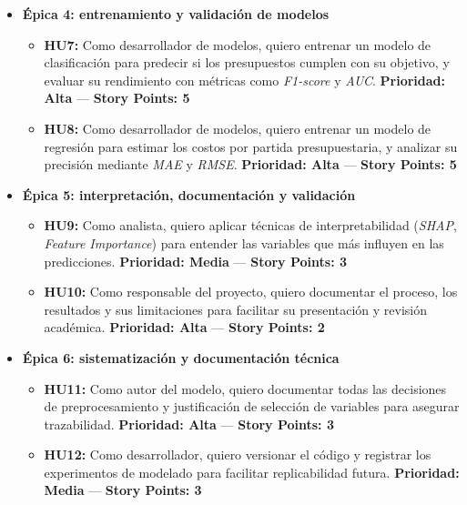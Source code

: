 \documentclass[
11pt, %
]{charter}
\begin{document}
\begin{itemize}
  \item \textbf{Épica 4: entrenamiento y validación de modelos}
    \begin{itemize}
      \item \textbf{HU7:} Como desarrollador de modelos, quiero entrenar un modelo de clasificación para predecir si los presupuestos cumplen con su objetivo, y evaluar su rendimiento con métricas como \textit{F1-score} y \textit{AUC}.  
      \newline \textbf{Prioridad: Alta} — \textbf{Story Points: 5}

      \item \textbf{HU8:} Como desarrollador de modelos, quiero entrenar un modelo de regresión para estimar los costos por partida presupuestaria, y analizar su precisión mediante \textit{MAE} y \textit{RMSE}.  
      \newline \textbf{Prioridad: Alta} — \textbf{Story Points: 5}
    \end{itemize}

  \item \textbf{Épica 5: interpretación, documentación y validación}
    \begin{itemize}
      \item \textbf{HU9:} Como analista, quiero aplicar técnicas de interpretabilidad (\textit{SHAP}, \textit{Feature Importance}) para entender las variables que más influyen en las predicciones.  
      \newline \textbf{Prioridad: Media} — \textbf{Story Points: 3}

      \item \textbf{HU10:} Como responsable del proyecto, quiero documentar el proceso, los resultados y sus limitaciones para facilitar su presentación y revisión académica.  
      \newline \textbf{Prioridad: Alta} — \textbf{Story Points: 2}
    \end{itemize}

  \item \textbf{Épica 6: sistematización y documentación técnica}
    \begin{itemize}
      \item \textbf{HU11:} Como autor del modelo, quiero documentar todas las decisiones de preprocesamiento y justificación de selección de variables para asegurar trazabilidad.  
      \newline \textbf{Prioridad: Alta} — \textbf{Story Points: 3}

      \item \textbf{HU12:} Como desarrollador, quiero versionar el código y registrar los experimentos de modelado para facilitar replicabilidad futura.  
      \newline \textbf{Prioridad: Media} — \textbf{Story Points: 3}
    \end{itemize}


\end{itemize}
\end{document}

